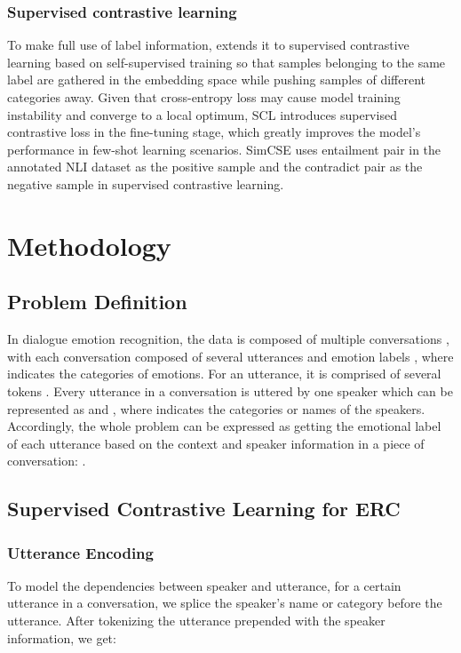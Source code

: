 \documentclass[letterpaper]{article} \usepackage{aaai22}  \usepackage{times}  \usepackage{helvet}  \usepackage{courier}  \usepackage[hyphens]{url}  \usepackage{graphicx} \urlstyle{rm} \def\UrlFont{\rm}  \usepackage{natbib}  \usepackage{caption} \DeclareCaptionStyle{ruled}{labelfont=normalfont,labelsep=colon,strut=off} \frenchspacing  \setlength{\pdfpagewidth}{8.5in}  \setlength{\pdfpageheight}{11in}  \usepackage{algorithm}
\begin{document}
\subsubsection{Supervised contrastive learning}
To make full use of label information, \citet{khosla2020supervisedcl} extends it to supervised contrastive learning based on self-supervised training so that samples belonging to the same label are gathered in the embedding space while pushing samples of different categories away. Given that cross-entropy loss may cause model training instability and converge to a local optimum, SCL \cite{scl-fine-tune} introduces supervised contrastive loss in the fine-tuning stage, which greatly improves the model's performance in few-shot learning scenarios. SimCSE \cite{simcse} uses entailment pair in the annotated NLI dataset as the positive sample and the contradict pair as the negative sample in supervised contrastive learning.



\section{Methodology}
\subsection{Problem Definition}
In dialogue emotion recognition, the data is composed of multiple conversations , with each conversation composed of several utterances  and emotion labels , where  indicates the categories of emotions. For an utterance, it is comprised of several tokens . Every utterance in a conversation  is uttered by one speaker which can be represented as  and , where  indicates the categories or names of the speakers. Accordingly, the whole problem can be expressed as getting the emotional label of each utterance based on the context and speaker information in a piece of conversation: .

\subsection{Supervised Contrastive Learning for ERC}
\subsubsection{Utterance Encoding}
To model the dependencies between speaker and utterance, for a certain utterance  in a conversation, we splice the speaker's name or category before the utterance.
After tokenizing the utterance prepended with the speaker information, we get:
\end{document}
